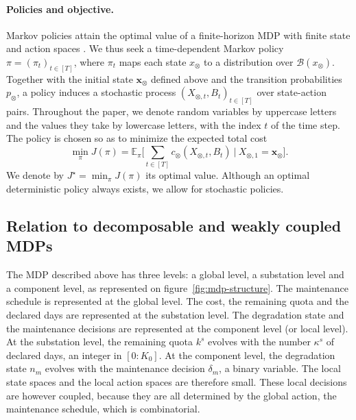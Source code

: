 \documentclass{article}
\begin{document}
\paragraph{Policies and objective.}
Markov policies attain the optimal value of a finite-horizon MDP with finite state and action spaces
\cite[Theorem 4.4.2]{puterman1994}. We thus seek a time-dependent Markov policy $\pi = (\pi_t)_{t \in [T]}$, where $\pi_t$
maps each state $x_\otimes$ to a distribution over $\mathcal{B}(x_\otimes)$. Together with the initial state
$\mathbf{x}_\otimes$ defined above and the transition probabilities $p_\otimes$, a policy induces a stochastic process
$(X_{\otimes,t}, B_t)_{t \in [T]}$ over state-action pairs. Throughout the paper, we denote random variables by
uppercase letters and the values they take by lowercase letters, with the index $t$ of the time step. The policy is chosen so as to minimize the expected total cost
\[
\min_\pi J(\pi) = \mathbb{E}_\pi \Bigg[ \sum_{t \in [T]} c_\otimes(X_{\otimes,t}, B_t) \ \Big| \ X_{{\otimes},1} = \mathbf{x}_{\otimes} \Bigg].
\]
We denote by $J^\star = \min_\pi J(\pi)$ its optimal value. Although an optimal deterministic policy always exists,
we allow for stochastic policies. 


\subsection{Relation to decomposable and weakly coupled MDPs}
\label{sec:decomposable-weakly-coupled}
\label{sec:local-variables}

The MDP described above has three levels: a global level, a substation level and a component level, as represented on figure~\ref{fig:mdp-structure}. 
The maintenance schedule is represented at the global level. The cost, the remaining quota and the declared days are represented at the substation level. 
The degradation state and the maintenance decisions are represented at the component level (or local level).
At the substation level, the remaining quota $k^s$ evolves with the number $\kappa^s$ of declared days, 
an integer in $[0:K_0]$. At the component level, the degradation state $n_m$ evolves with the maintenance 
decision $\delta_m$, a binary variable. The local state spaces and the local action spaces are therefore small. These local decisions are however coupled, because they are all determined by the global action, the maintenance schedule, which is combinatorial.
\end{document}
